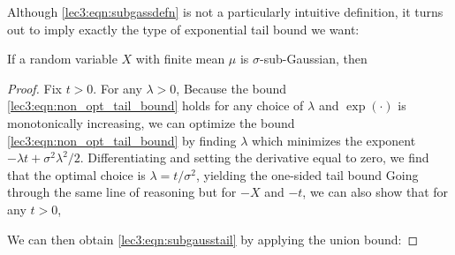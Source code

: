 \noindent Although \eqref{lec3:eqn:subgassdefn} is not a particularly intuitive definition, it turns out to imply exactly the type of exponential tail bound we want:

\begin{theorem}\label{lec3:thm:subgausstail}
    If a random variable $X$ with finite mean $\mu$ is $\sigma$-sub-Gaussian, then
\end{theorem}

\begin{proof}
Fix $t > 0$. For any $\lambda > 0$,
Because the bound \eqref{lec3:eqn:non_opt_tail_bound} holds for any choice of $\lambda$ and $\exp(\cdot)$ is monotonically increasing, we can optimize the bound \eqref{lec3:eqn:non_opt_tail_bound} by finding $\lambda$ which minimizes the exponent $-\lambda t + \sigma^2 \lambda^2/2$. Differentiating and setting the derivative equal to zero, we find that the optimal choice is $\lambda = t/\sigma^2$, yielding the one-sided tail bound
Going through the same line of reasoning but for $-X$ and $-t$, we can also show that for any $t > 0$,

We can then obtain \eqref{lec3:eqn:subgausstail} by applying the union bound:
\end{proof}

